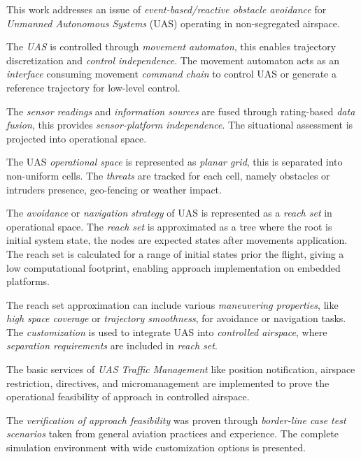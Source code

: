 \noindent This work addresses an issue of \emph{event-based/reactive obstacle avoidance} for \emph{Unmanned Autonomous Systems} (UAS) operating in non-segregated airspace. 

The \emph{UAS} is controlled through \emph{movement automaton}, this enables trajectory discretization and \emph{control independence}. The movement automaton acts as an \emph{interface} consuming movement \emph{command chain} to control UAS or generate a reference trajectory for low-level control.

The \emph{sensor readings} and \emph{information sources} are fused through rating-based \emph{data fusion}, this provides \emph{sensor-platform independence}. The situational assessment is projected into operational space.

The UAS \emph{operational space} is represented as \emph{planar grid}, this is separated into non-uniform cells. The \emph{threats} are tracked for each cell, namely obstacles or intruders presence, geo-fencing or weather impact. 

The \emph{avoidance} or \emph{navigation strategy} of UAS is represented as a \emph{reach set} in operational space. The \emph{reach set} is approximated as a tree where the root is initial system state, the nodes are expected states after movements application. The reach set is calculated for a range of initial states prior the flight, giving a low computational footprint, enabling approach implementation on embedded platforms. 

The reach set approximation can include various \emph{maneuvering properties}, like \emph{high space coverage} or \emph{trajectory smoothness}, for avoidance or navigation tasks. The \emph{customization} is used to integrate UAS into \emph{controlled airspace}, where \emph{separation requirements} are included in \emph{reach set}.

The basic services of \emph{UAS Traffic Management} like position notification, airspace restriction, directives, and micromanagement are implemented to prove the operational feasibility of approach in controlled airspace. 

The \emph{verification of approach feasibility} was proven through \emph{border-line case test scenarios} taken from general aviation practices and experience. The complete simulation environment with wide customization options is presented.